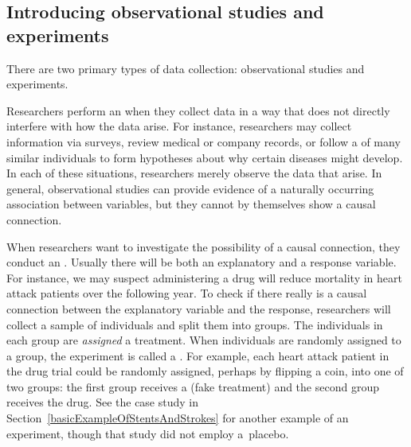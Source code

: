 

\subsection{Introducing observational studies and experiments}


\noindent%
There are two primary types of data collection:
observational studies and experiments.

Researchers perform an  when they
collect data in a way that does not directly interfere with
how the data arise.
For instance, researchers may collect information via surveys,
review medical or company records, or follow a 
of many similar individuals to form hypotheses about why certain
diseases might develop.
In each of these situations, researchers merely observe the
data that arise.
In general, observational studies can provide evidence of
a naturally occurring association between variables, but they
cannot by themselves show a causal connection.

When researchers want to investigate the possibility of
a causal connection, they conduct an .
Usually there will be both an explanatory and a response
variable.
For instance, we may suspect administering a drug will reduce
mortality in heart attack patients over the following year.
To check if there really is a causal connection between the
explanatory variable and the response, researchers will collect
a sample of individuals and split them into groups.
The individuals in each group are \emph{assigned} a treatment.
When individuals are randomly assigned to a group,
the experiment is called a .
For example, each heart attack patient in the drug trial
could be randomly assigned,  perhaps by flipping a coin,
into one of two groups:
the first group receives a  (fake treatment)
and the second group receives the drug.
See the case study in
Section~\ref{basicExampleOfStentsAndStrokes} for another
example of an experiment, though that study did not employ
a~placebo.

